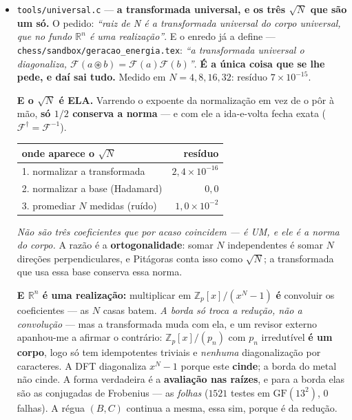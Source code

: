 \documentclass[11pt]{article}
\newcommand{\code}[1]{\texttt{\small #1}}
\newcommand{\Z}{\mathbb Z}
\newcommand{\GF}{\mathrm{GF}}
\theoremstyle{plain}
\theoremstyle{remark}
\begin{document}
\begin{itemize}
\item \code{tools/universal.c} --- \textbf{a transformada universal, e os três $\sqrt N$ que são um
só.} O pedido: \emph{``raiz de N é a transformada universal do corpo universal, que no fundo
$\mathbb{R}^n$ é uma realização''}. E o enredo já a define --- \code{chess/sandbox/geracao\_energia.tex}:
\emph{``a transformada universal o diagonaliza, $\mathcal{F}(a\circledast b)=\mathcal{F}(a)\mathcal{F}(b)$''}.
\textbf{É a única coisa que se lhe pede, e daí sai tudo.} Medido em $N=4,8,16,32$: resíduo
$7\times10^{-15}$.

\textbf{E o $\sqrt N$ é ELA.} Varrendo o expoente da normalização em vez de o pôr à mão,
\textbf{só $1/2$ conserva a norma} --- e com ele a ida-e-volta fecha exata ($\mathcal{F}^\dagger =
\mathcal{F}^{-1}$).

\begin{center}
\begin{tabular}{lr}
\toprule
onde aparece o $\sqrt N$ & resíduo \\
\midrule
1. normalizar a transformada & $2{,}4\times10^{-16}$ \\
2. normalizar a base (Hadamard) & $0{,}0$ \\
3. promediar $N$ medidas (ruído) & $1{,}0\times10^{-2}$ \\
\bottomrule
\end{tabular}
\end{center}

\emph{Não são três coeficientes que por acaso coincidem --- é UM, e ele é a norma do corpo.} A razão
é a \textbf{ortogonalidade}: somar $N$ independentes é somar $N$ direções perpendiculares, e
Pitágoras conta isso como $\sqrt N$; a transformada que usa essa base conserva essa norma.

\textbf{E $\mathbb{R}^n$ é uma realização:} multiplicar em $\mathbb{Z}_p[x]/(x^N-1)$ \textbf{é}
convoluir os coeficientes --- as $N$ casas batem. \emph{A borda só troca a redução, não a
convolução} --- mas a transformada muda com ela, e um revisor externo apanhou-me a afirmar o
contrário: $\Z_p[x]/(p_n)$ com $p_n$ irredutível \textbf{é um corpo}, logo só tem idempotentes
triviais e \emph{nenhuma} diagonalização por caracteres. A DFT diagonaliza $x^N-1$ porque este
\textbf{cinde}; a borda do metal não cinde. A forma verdadeira é a \textbf{avaliação nas raízes},
e para a borda elas são as conjugadas de Frobenius --- as \emph{folhas} ($1521$ testes em
$\GF(13^2)$, $0$ falhas). A régua $(B,C)$ continua a mesma, essa sim, porque é da redução.


\end{itemize}
\end{document}
